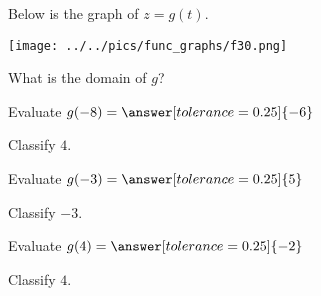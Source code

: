 \documentclass{ximera}
\author{Lee Wayand}
\begin{document}
\begin{exercise}  





Below is the graph of $z=g(t)$.  

\begin{image}
\texttt{[image: ../../pics/func\_graphs/f30.png]}
\end{image}


\begin{question} 

What is the domain of $g$?


\begin{multipleChoice}
\choice {$[-8, -3) \cup (-3, 4) \cup (4, 8)$}
\choice {$[-6, 8)$}
\choice {$(-\infty, \infty)$}
\choice {$[-8, 8]$}

\end{multipleChoice}

\end{question}





\begin{question} 






Evaluate $g(-8) = \answer[tolerance=0.25]{-6}$


Classify $4$. \\


\begin{multipleChoice}
\end{multipleChoice}





Evaluate $g(-3) = \answer[tolerance=0.25]{5}$


Classify $-3$. \\


\begin{multipleChoice}
\end{multipleChoice}





Evaluate $g(4) = \answer[tolerance=0.25]{-2}$


Classify $4$. \\


\begin{multipleChoice}
\end{multipleChoice}





\end{question}
\end{exercise}
\end{document}
